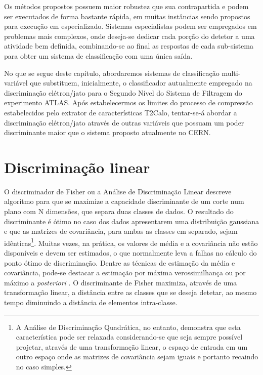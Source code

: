 Os métodos propostos possuem maior robustez que sua contrapartida e podem ser
executados de forma bastante rápida, em muitas instâncias sendo propostos para
execução em  especializado. Sistemas especialistas podem ser
empregados em problemas mais complexos, onde deseja-se dedicar cada porção do
detetor a uma atividade bem definida, combinando-se ao final as respostas de
cada sub-sistema para obter um sistema de classificação com uma única saída.

No que se segue deste capítulo, abordaremos sistemas de classificação
multi-variável que substituem, inicialmente, o classificador autualmente
empregado na discriminação elétron/jato para o Segundo Nível do Sistema de
Filtragem do experimento ATLAS. Após estabelecermos os limites do processo de
compressão estabelecidos pelo extrator de características T2Calo, tentar-se-á
abordar a discriminação elétron/jato através de outras variáveis que possuam
um poder discriminante maior que o sistema proposto atualmente no CERN.

\section{Discriminação linear}
\label{sec:lms}

O discriminador de Fisher \cite{fisher} ou a Análise de Discriminação Linear
descreve algoritmo para que se maximize a capacidade discriminante de um corte
num plano com N dimensões, que separa duas classes de dados. O resultado do
discriminante é ótimo no caso dos dados apresentarem uma distribuição
gaussiana e que as matrizes de covariância, para ambas as classes em separado,
sejam idênticas\footnote{A Análise de Discriminação Quadrática, no entanto,
demonstra que esta característica pode ser relaxada considerando-se que seja
sempre possível projetar, através de uma transformação linear, o espaço de
entrada em um outro espaço onde as matrizes de covariância sejam iguais e
portanto recaindo no caso simples.}. Muitas vezes, na prática, os valores de
média e a covariância não estão disponíveis e devem ser estimados, o que
normalmente leva a falhas no cálculo do ponto ótimo de discriminação. Dentre
as técnicas de estimação da média e covariância, pode-se destacar a estimação
por máxima verossimilhança ou por máximo a \textit{posteriori} \cite{duda}. O
discriminante de Fisher maximiza, através de uma transformação linear, a
distância entre as classes que se deseja detetar, ao mesmo tempo diminuindo a
distância de elementos intra-classe.

